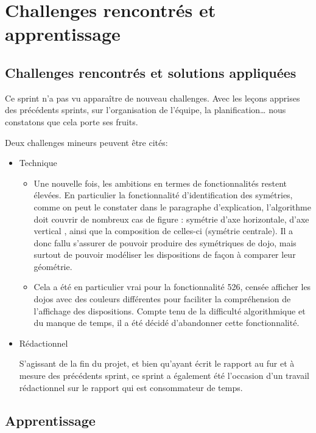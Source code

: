 \section{Challenges rencontrés et apprentissage}

\subsection{Challenges rencontrés et solutions appliquées}

Ce sprint n’a pas vu apparaître de nouveau challenges. Avec les leçons apprises des précédents sprints, sur l’organisation de l'équipe, 
la planification… nous constatons que cela porte ses fruits.

Deux challenges mineurs peuvent être cités:
\begin{itemize}
    \item Technique
    \begin{itemize}
        \item Une nouvelle fois, les ambitions en termes de fonctionnalités restent élevées. En particulier la fonctionnalité 
        d'identification des symétries, comme on peut le constater dans le paragraphe d’explication, l’algorithme doit couvrir 
        de nombreux cas de figure : symétrie d’axe horizontale, d’axe vertical , ainsi que la composition de celles-ci (symétrie centrale). 
        Il a donc fallu s’assurer de pouvoir produire des symétriques de dojo, mais surtout de pouvoir modéliser les dispositions de façon 
        à comparer leur géométrie.
        \item Cela a été en particulier vrai pour la fonctionnalité 526, censée afficher les dojos avec des couleurs différentes pour faciliter 
        la compréhension de l’affichage des dispositions. Compte tenu de la difficulté algorithmique et du manque de temps, il a été décidé 
        d’abandonner cette fonctionnalité.

    \end{itemize}
    \item Rédactionnel
    
    S’agissant de la fin du projet, et bien qu’ayant écrit le rapport au fur et à mesure des précédents sprint, ce sprint a également été 
    l’occasion d’un travail rédactionnel sur le rapport qui est consommateur de temps.

\end{itemize}

\subsection{Apprentissage}

